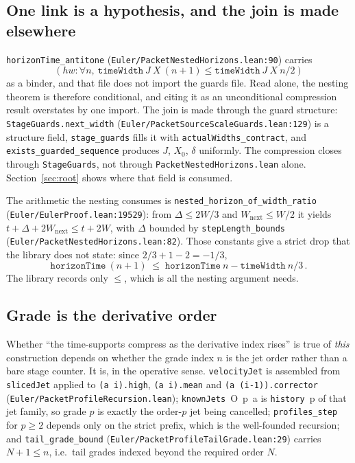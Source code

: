 \documentclass[11pt]{article}
\newcommand{\ct}[1]{\texttt{#1}}
\newcommand{\file}[1]{\texttt{\small #1}}
\theoremstyle{plain}
\theoremstyle{definition}
\theoremstyle{remark}
\begin{document}
\subsection{One link is a hypothesis, and the join is made elsewhere}

\ct{horizonTime\_antitone} (\file{Euler/PacketNestedHorizons.lean:90}) carries
\[
  (hw : \forall n,\ \ct{timeWidth}\ J\ X\ (n+1) \le \ct{timeWidth}\ J\ X\ n/2)
\]
as a binder, and that file does not import the guards file. Read alone, the
nesting theorem is therefore conditional, and citing it as an unconditional
compression result overstates by one import. The join is made through the guard
structure: \ct{StageGuards.next\_width}
(\file{Euler/PacketSourceScaleGuards.lean:129}) is a structure field,
\ct{stage\_guards} fills it with \ct{actualWidths\_contract}, and
\ct{exists\_guarded\_sequence} produces $J$, $X_0$, $\delta$ uniformly. The
compression closes through \ct{StageGuards}, not through
\file{PacketNestedHorizons.lean} alone. Section~\ref{sec:root} shows where that
field is consumed.

The arithmetic the nesting consumes is \ct{nested\_horizon\_of\_width\_ratio}
(\file{Euler/EulerProof.lean:19529}): from $\Delta\le 2W/3$ and
$W_{\mathrm{next}}\le W/2$ it yields $t+\Delta+2W_{\mathrm{next}}\le t+2W$, with
$\Delta$ bounded by \ct{stepLength\_bounds}
(\file{Euler/PacketNestedHorizons.lean:82}). Those constants give a strict drop
that the library does not state: since $2/3+1-2=-1/3$,
\[
  \ct{horizonTime}\ (n+1)\;\le\;\ct{horizonTime}\ n-\ct{timeWidth}\ n/3\,.
\]
The library records only $\le$, which is all the nesting argument needs.

\subsection{Grade is the derivative order}

Whether ``the time-supports compress as the derivative index rises'' is true of
\emph{this} construction depends on whether the grade index $n$ is the jet order
rather than a bare stage counter. It is, in the operative sense. \ct{velocityJet}
is assembled from \ct{slicedJet} applied to \ct{(a i).high}, \ct{(a i).mean} and
\ct{(a (i-1)).corrector} (\file{Euler/PacketProfileRecursion.lean});
\ct{knownJets}\ O\ p\ a is \ct{history}\ p of that jet family, so grade $p$ is
exactly the order-$p$ jet being cancelled; \ct{profiles\_step} for $p\ge 2$
depends only on the strict prefix, which is the well-founded recursion; and
\ct{tail\_grade\_bound} (\file{Euler/PacketProfileTailGrade.lean:29}) carries
$N+1\le n$, i.e.\ tail grades indexed beyond the required order $N$.
\end{document}
